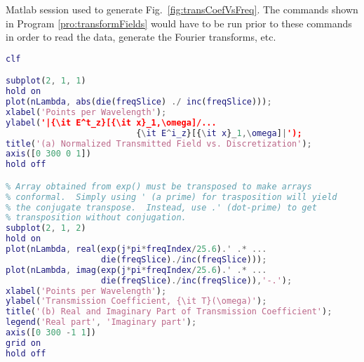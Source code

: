 \begin{program}
Matlab session used to generate Fig.\
\ref{fig:transCoefVsFreq}.  The commands shown in Program
\ref{pro:transformFields} would have to be run prior to these
commands in order to read the data, generate the Fourier transforms, etc.
 \label{pro:transCoefficient}
\codemiddle
\begin{lstlisting}[language=Matlab]
clf

subplot(2, 1, 1)
hold on
plot(nLambda, abs(die(freqSlice) ./ inc(freqSlice)));
xlabel('Points per Wavelength');
ylabel('|{\it E^t_z}[{\it x}_1,\omega]/...
                          {\it E^i_z}[{\it x}_1,\omega]|');
title('(a) Normalized Transmitted Field vs. Discretization');
axis([0 300 0 1])
hold off

% Array obtained from exp() must be transposed to make arrays
% conformal.  Simply using ' (a prime) for trasposition will yield
% the conjugate transpose.  Instead, use .' (dot-prime) to get
% transposition without conjugation.
subplot(2, 1, 2)
hold on
plot(nLambda, real(exp(j*pi*freqIndex/25.6).' .* ...
                   die(freqSlice)./inc(freqSlice)));
plot(nLambda, imag(exp(j*pi*freqIndex/25.6).' .* ...
                   die(freqSlice)./inc(freqSlice)),'-.');
xlabel('Points per Wavelength');
ylabel('Transmission Coefficient, {\it T}(\omega)');
title('(b) Real and Imaginary Part of Transmission Coefficient');
legend('Real part', 'Imaginary part');
axis([0 300 -1 1])
grid on
hold off
\end{lstlisting}
\end{program}
